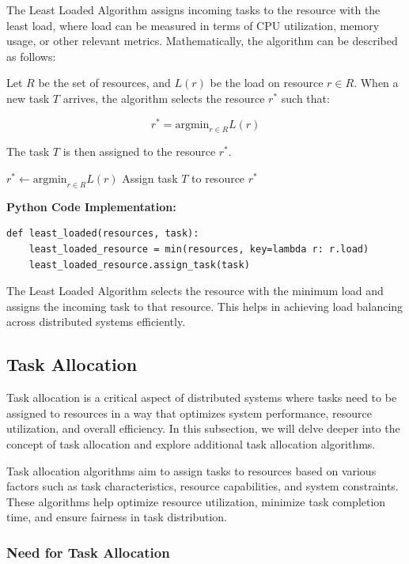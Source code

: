 \documentclass[12pt]{book} %
\begin{document}
The Least Loaded Algorithm assigns incoming tasks to the resource with the least load, where load can be measured in terms of CPU utilization, memory usage, or other relevant metrics. Mathematically, the algorithm can be described as follows:

Let $R$ be the set of resources, and $L(r)$ be the load on resource $r \in R$. When a new task $T$ arrives, the algorithm selects the resource $r^*$ such that:

$$r^* = \text{argmin}_{r \in R} L(r)$$

The task $T$ is then assigned to the resource $r^*$.
\FloatBarrier
\begin{algorithm}[H]
\caption{Least Loaded Algorithm}\label{alg:least_loaded}
\begin{algorithmic}[1]
\State $r^* \gets \text{argmin}_{r \in R} L(r)$
\State Assign task $T$ to resource $r^*$
\EndProcedure
\end{algorithmic}
\end{algorithm}
\FloatBarrier   
\textbf{Python Code Implementation:}
\FloatBarrier
\begin{lstlisting}
def least_loaded(resources, task):
    least_loaded_resource = min(resources, key=lambda r: r.load)
    least_loaded_resource.assign_task(task)
\end{lstlisting}
\FloatBarrier
The Least Loaded Algorithm selects the resource with the minimum load and assigns the incoming task to that resource. This helps in achieving load balancing across distributed systems efficiently.

\subsection{Task Allocation}

Task allocation is a critical aspect of distributed systems where tasks need to be assigned to resources in a way that optimizes system performance, resource utilization, and overall efficiency. In this subsection, we will delve deeper into the concept of task allocation and explore additional task allocation algorithms.

Task allocation algorithms aim to assign tasks to resources based on various factors such as task characteristics, resource capabilities, and system constraints. These algorithms help optimize resource utilization, minimize task completion time, and ensure fairness in task distribution.

\subsubsection{Need for Task Allocation}
\end{document}
